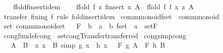 \begin{isabellebody}
\isanewline
\ \ \isamarkupfalse%
\ ffold{\isacharunderscore}finsert{\isacharunderscore}idem{}{\isacharcolon}\isanewline
\ \ \ \ {\isachardoublequoteopen}ffold\ f\ z\ {\isacharparenleft}finsert\ x\ A{\isacharparenright}\ {\isacharequal}\ ffold\ f\ {\isacharparenleft}f\ x\ z{\isacharparenright}\ A{\isachardoublequoteclose}\isanewline
%
\isadelimproof
\ \ \ \ %
\endisadelimproof
%
\isatagproof
{}\isamarkupfalse%
\ {\isacharparenleft}transfer\ fixing{\isacharcolon}\ f{\isacharparenright}\ {\isacharparenleft}rule\ fold{\isacharunderscore}insert{\isacharunderscore}idem{}{\isacharparenright}%
\endisatagproof
{\isafoldproof}%
%
\isadelimproof
\isanewline
%
\endisadelimproof
\isanewline
{}\isamarkupfalse%
%
\isadelimdocument
%
\endisadelimdocument
%
\isatagdocument
%
\isamarkuptrue%
%
\endisatagdocument
{\isafolddocument}%
%
\isadelimdocument
%
\endisadelimdocument
{}\isamarkupfalse%
\ comm{\isacharunderscore}monoid{\isacharunderscore}fset\ {\isacharequal}\ comm{\isacharunderscore}monoid\isanewline
{}\isanewline
\isanewline
{}\isamarkupfalse%
\ set{\isacharcolon}\ comm{\isacharunderscore}monoid{\isacharunderscore}set%
\isadelimproof
\ %
\endisadelimproof
%
\isatagproof
\isacommand{{\isachardot}{\isachardot}}\isamarkupfalse%
%
\endisatagproof
{\isafoldproof}%
%
\isadelimproof
%
\endisadelimproof
\isanewline
\isanewline
{}\isamarkupfalse%
\ F\ {\isacharcolon}{\isacharcolon}\ {\isachardoublequoteopen}{\isacharparenleft}{\isacharprime}b\ {\isasymRightarrow}\ {\isacharprime}a{\isacharparenright}\ {\isasymRightarrow}\ {\isacharprime}b\ fset\ {\isasymRightarrow}\ {\isacharprime}a{\isachardoublequoteclose}\ \ set{\isachardot}F%
\isadelimproof
\ %
\endisadelimproof
%
\isatagproof
\isacommand{{\isachardot}}\isamarkupfalse%
%
\endisatagproof
{\isafoldproof}%
%
\isadelimproof
%
\endisadelimproof
\isanewline
\isanewline
{}\isamarkupfalse%
\ cong{\isacharbrackleft}fundef{\isacharunderscore}cong{\isacharbrackright}\ {\isacharequal}\ set{\isachardot}cong{\isacharbrackleft}Transfer{\isachardot}transferred{\isacharbrackright}\isanewline
\isanewline
{}\isamarkupfalse%
\ cong{\isacharunderscore}simp{\isacharbrackleft}cong{\isacharbrackright}{\isacharcolon}\isanewline
\ \ {\isachardoublequoteopen}{\isasymlbrakk}\ A\ {\isacharequal}\ B{\isacharsemicolon}\ \ {\isasymAnd}x{\isachardot}\ x\ {\isacharbar}{\isasymin}{\isacharbar}\ B\ {\isacharequal}simp{\isacharequal}{\isachargreater}\ g\ x\ {\isacharequal}\ h\ x\ {\isasymrbrakk}\ {\isasymLongrightarrow}\ F\ g\ A\ {\isacharequal}\ F\ h\ B{\isachardoublequoteclose}\isanewline

\end{isabellebody}
